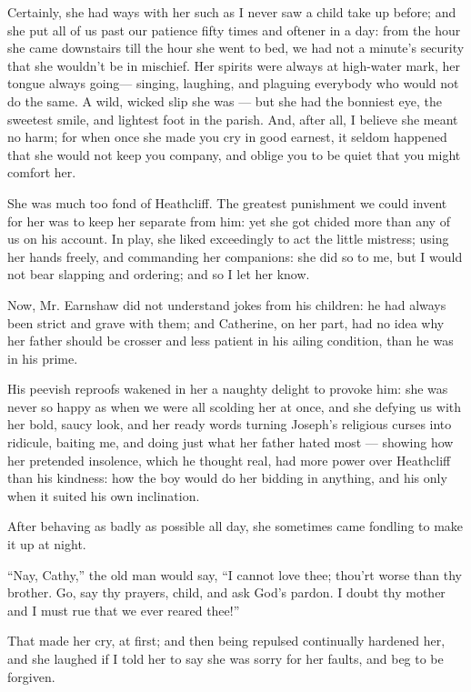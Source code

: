 \par Certainly, she had ways with her such as I never saw a child take up before; and she put all of us past our patience fifty times and oftener in a day: from the hour she came downstairs till the hour she went to bed, we had not a minute's security that she wouldn't be in mischief. Her spirits were always at high-water mark, her tongue always going— singing, laughing, and plaguing everybody who would not do the same. A wild, wicked slip she was — but she had the bonniest eye, the sweetest smile, and lightest foot in the parish. And, after all, I believe she meant no harm; for when once she made you cry in good earnest, it seldom happened that she would not keep you company, and oblige you to be quiet that you might comfort her.
\par She was much too fond of Heathcliff. The greatest punishment we could invent for her was to keep her separate from him: yet she got chided more than any of us on his account. In play, she liked exceedingly to act the little mistress; using her hands freely, and commanding her companions: she did so to me, but I would not bear slapping and ordering; and so I let her know.
\par Now, Mr. Earnshaw did not understand jokes from his children: he had always been strict and grave with them; and Catherine, on her part, had no idea why her father should be crosser and less patient in his ailing condition, than he was in his prime.
\par His peevish reproofs wakened in her a naughty delight to provoke him: she was never so happy as when we were all scolding her at once, and she defying us with her bold, saucy look, and her ready words turning Joseph's religious curses into ridicule, baiting me, and doing just what her father hated most — showing how her pretended insolence, which he thought real, had more power over Heathcliff than his kindness: how the boy would do her bidding in anything, and his only when it suited his own inclination.
\par After behaving as badly as possible all day, she sometimes came fondling to make it up at night.
\par “Nay, Cathy,” the old man would say, “I cannot love thee; thou'rt worse than thy brother. Go, say thy prayers, child, and ask God's pardon. I doubt thy mother and I must rue that we ever reared thee!”
\par That made her cry, at first; and then being repulsed continually hardened her, and she laughed if I told her to say she was sorry for her faults, and beg to be forgiven.
